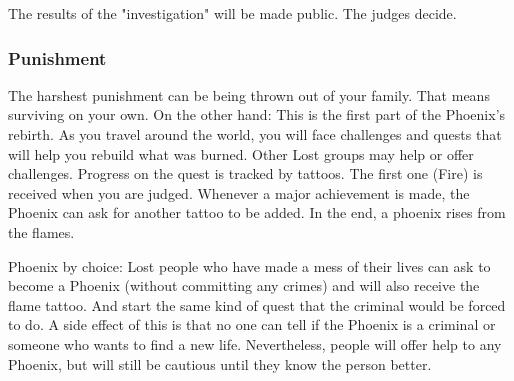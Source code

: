 The results of the "investigation" will be made public. The judges decide.

\subsubsection{Punishment}

The harshest punishment can be being thrown out of your family. That means surviving on your own. On the other hand: This is the first part of the Phoenix's rebirth. As you travel around the world, you will face challenges and quests that will help you rebuild what was burned. Other Lost groups may help or offer challenges.
Progress on the quest is tracked by tattoos. The first one (Fire) is received when you are judged. Whenever a major achievement is made, the Phoenix can ask for another tattoo to be added. In the end, a phoenix rises from the flames.

Phoenix by choice: Lost people who have made a mess of their lives can ask to become a Phoenix (without committing any crimes) and will also receive the flame tattoo. And start the same kind of quest that the criminal would be forced to do. A side effect of this is that no one can tell if the Phoenix is a criminal or someone who wants to find a new life. Nevertheless, people will offer help to any Phoenix, but will still be cautious until they know the person better.


